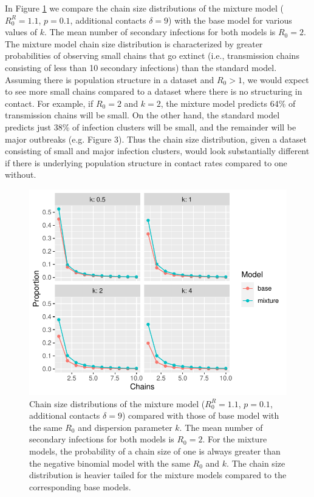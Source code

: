 \documentclass{imammb}
\numberwithin{equation}{section}
\begin{document}
In Figure \ref{fig:chains} we compare the chain size distributions of the mixture model ($R_0^R=1.1$, $p=0.1$, additional contacts $\delta =9$) with the base model for various values of $k$. The mean number of secondary infections for both models is $R_0 =2$. The mixture model chain size distribution is characterized by greater probabilities of observing small chains that go extinct (i.e., transmission chains consisting of less than 10 secondary infections) than the standard model. Assuming there is population structure in a dataset and $R_0>1$, we would expect to see more small chains compared to a dataset where there is no structuring in contact. For example, if $R_0=2$ and $k=2$, the mixture model predicts 64\% of transmission chains will be small. On the other hand, the standard model predicts just 38\% of infection clusters will be small, and the remainder will be major outbreaks (e.g. Figure 3). Thus the chain size distribution, given a dataset consisting of small and major infection clusters, would look substantially different if there is underlying population structure in contact rates compared to one without. %



\begin{figure}
    \centering
    \includegraphics{Figure2.pdf}
    \caption{Chain size distributions of the mixture model ($R_0^R=1.1$, $p=0.1$, additional contacts $\delta =9$) compared with those of base model with the same $R_0$ and dispersion parameter $k$. The mean number of secondary infections for both models is $R_0 =2$. For the mixture models, the probability of a chain size of one is always greater than the negative binomial model with the same $R_0$ and $k$.  The chain size distribution is heavier tailed for the mixture models compared to the corresponding base models. }
    \label{fig:chains}
\end{figure}
\end{document}
